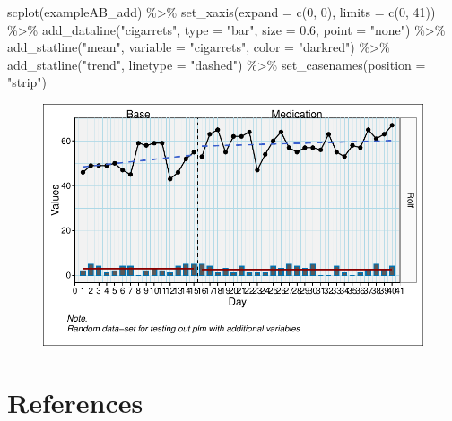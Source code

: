 \documentclass[
  letterpaper,
  DIV=11,
  numbers=noendperiod]{scrreprt}
\newenvironment{Shaded}{\begin{snugshade}}{\end{snugshade}}
\newcommand{\AttributeTok}[1]{\textcolor[rgb]{0.40,0.45,0.13}{#1}}
\newcommand{\DecValTok}[1]{\textcolor[rgb]{0.68,0.00,0.00}{#1}}
\newcommand{\FloatTok}[1]{\textcolor[rgb]{0.68,0.00,0.00}{#1}}
\newcommand{\FunctionTok}[1]{\textcolor[rgb]{0.28,0.35,0.67}{#1}}
\newcommand{\NormalTok}[1]{\textcolor[rgb]{0.00,0.23,0.31}{#1}}
\newcommand{\SpecialCharTok}[1]{\textcolor[rgb]{0.37,0.37,0.37}{#1}}
\newcommand{\StringTok}[1]{\textcolor[rgb]{0.13,0.47,0.30}{#1}}
\begin{document}
\begin{Shaded}
\begin{Highlighting}[]
\FunctionTok{scplot}\NormalTok{(exampleAB\_add) }\SpecialCharTok{\%\textgreater{}\%}
  \FunctionTok{set\_xaxis}\NormalTok{(}\AttributeTok{expand =} \FunctionTok{c}\NormalTok{(}\DecValTok{0}\NormalTok{, }\DecValTok{0}\NormalTok{), }\AttributeTok{limits =} \FunctionTok{c}\NormalTok{(}\DecValTok{0}\NormalTok{, }\DecValTok{41}\NormalTok{)) }\SpecialCharTok{\%\textgreater{}\%}
  \FunctionTok{add\_dataline}\NormalTok{(}\StringTok{"cigarrets"}\NormalTok{, }\AttributeTok{type =} \StringTok{"bar"}\NormalTok{, }\AttributeTok{size =} \FloatTok{0.6}\NormalTok{, }\AttributeTok{point =} \StringTok{"none"}\NormalTok{) }\SpecialCharTok{\%\textgreater{}\%}
  \FunctionTok{add\_statline}\NormalTok{(}\StringTok{"mean"}\NormalTok{, }\AttributeTok{variable =} \StringTok{"cigarrets"}\NormalTok{, }\AttributeTok{color =} \StringTok{"darkred"}\NormalTok{) }\SpecialCharTok{\%\textgreater{}\%}
  \FunctionTok{add\_statline}\NormalTok{(}\StringTok{"trend"}\NormalTok{, }\AttributeTok{linetype =} \StringTok{"dashed"}\NormalTok{) }\SpecialCharTok{\%\textgreater{}\%}
  \FunctionTok{set\_casenames}\NormalTok{(}\AttributeTok{position =} \StringTok{"strip"}\NormalTok{)}
\end{Highlighting}
\end{Shaded}

\begin{figure}[H]

{\centering \includegraphics{./ch_scplot_files/figure-pdf/complex4-1.pdf}

}

\end{figure}

\hypertarget{references}{%
\chapter*{References}\label{references}}
\end{document}

